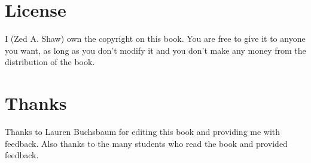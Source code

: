 \section{License}

I (Zed A. Shaw) own the copyright on this book.  You are free to give it to anyone you want,
as long as you don't modify it and you don't make any money from the distribution
of the book.


\section{Thanks}

Thanks to Lauren Buchsbaum for editing this book and providing me with feedback.  Also thanks to
the many students who read the book and provided feedback.

